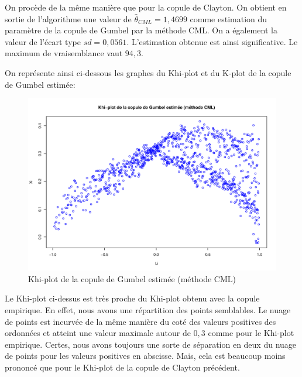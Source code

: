 On procède de la même manière que pour la copule de Clayton. On obtient en sortie de l'algorithme une valeur de $\widehat{\theta}_{CML}=1,4699$ comme estimation du paramètre de la copule de Gumbel par la méthode CML. On a également la valeur de l'écart type $sd = 0,0561$. L'estimation obtenue est ainsi significative. Le maximum de vraisemblance vaut $94,3$.

On représente ainsi ci-dessous les graphes du Khi-plot et du K-plot de la copule de Gumbel estimée:

\noindent%
\begin{figure}[H]
    \begin{center}
      \includegraphics[width=17 cm, angle=0]{./pictures/gumbelcmlkhiplot.png}
      \centering\caption{\label{2}Khi-plot de la copule de Gumbel estimée (méthode CML)}
    \end{center}
\end{figure}

Le Khi-plot ci-dessus est très proche du Khi-plot obtenu avec la copule empirique. En effet, nous avons une répartition des points semblables. Le nuage de points est incurvée de la même manière du coté des valeurs positives des ordonnées et atteint une valeur maximale autour de $0,3$ comme pour le Khi-plot empirique. Certes, nous avons toujours une sorte de séparation en deux du nuage de points pour les valeurs positives en abscisse. Mais, cela est beaucoup moins prononcé que pour le Khi-plot de la copule de Clayton précédent.


